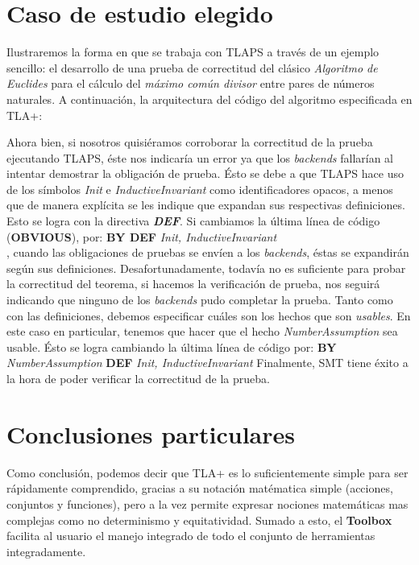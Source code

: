 \documentclass[spanish]{llncs}
\begin{document}
\section{Caso de estudio elegido}

Ilustraremos la forma en que se trabaja con TLAPS a través de un ejemplo sencillo\cite{example}: 
el desarrollo de una prueba de correctitud del clásico \textit{Algoritmo de Euclides} para el cálculo del \textit{máximo común divisor} entre pares de números naturales.
A continuación, la arquitectura del código del algoritmo especificada en TLA+:
  
  
Ahora bien, si nosotros quisiéramos corroborar la correctitud de la prueba ejecutando TLAPS, éste nos indicaría un error ya que los \textit{backends} fallarían al intentar demostrar la obligación de prueba. Ésto se debe a que TLAPS
hace uso de los símbolos \textit{Init} e \textit{InductiveInvariant} como identificadores opacos, a menos que de manera explícita se les indique que expandan sus respectivas definiciones. Esto se logra con la directiva \textbf{\textit{DEF}}. 
Si cambiamos la última línea de código (\textbf{OBVIOUS}), por:
\subitem \textbf{BY DEF} \textit{Init, InductiveInvariant}\\
, cuando las obligaciones de pruebas se envíen a los \textit{backends}, éstas se expandirán según sus definiciones. Desafortunadamente, todavía no es suficiente para probar la correctitud del teorema, si hacemos la verificación de prueba, nos seguirá indicando que ninguno de los \textit{backends} pudo completar la prueba.
Tanto como con las definiciones, debemos especificar cuáles son los hechos que son \textit{usables}. En este caso en particular, tenemos que hacer que el hecho \textit{NumberAssumption} sea usable. Ésto se logra cambiando la última línea de código por:
\subitem \textbf{BY} \textit{NumberAssumption} \textbf{DEF} \textit{Init, InductiveInvariant}
Finalmente, SMT tiene éxito a la hora de poder verificar la correctitud de la prueba.


\section{Conclusiones particulares}

Como conclusión, podemos decir que TLA+ es lo suficientemente simple para ser rápidamente comprendido, gracias a su notación matématica simple (acciones, conjuntos y funciones), 
pero a la vez permite expresar nociones matemáticas mas complejas como no determinismo y equitatividad. Sumado a esto, el \textbf{Toolbox} facilita al usuario el manejo integrado de todo el conjunto de herramientas integradamente. 
\end{document}
